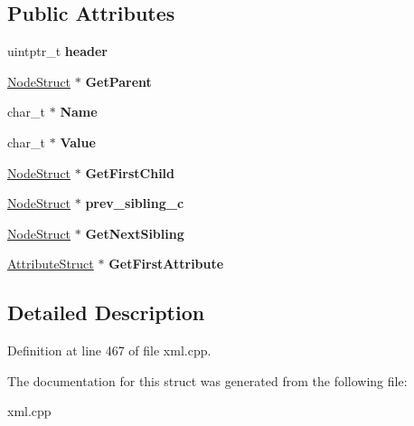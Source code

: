 \subsection*{Public Attributes}
\begin{DoxyCompactItemize}
\item 
\hypertarget{structphys_1_1xml_1_1NodeStruct_a68ff269f03bdab91cbeb96174d4df3a8}{
uintptr\_\-t {\bfseries header}}
\label{d7/dd5/structphys_1_1xml_1_1NodeStruct_a68ff269f03bdab91cbeb96174d4df3a8}

\item 
\hypertarget{structphys_1_1xml_1_1NodeStruct_a18b9637a936d402699a28f37866140b8}{
\hyperlink{structphys_1_1xml_1_1NodeStruct}{NodeStruct} $\ast$ {\bfseries GetParent}}
\label{d7/dd5/structphys_1_1xml_1_1NodeStruct_a18b9637a936d402699a28f37866140b8}

\item 
\hypertarget{structphys_1_1xml_1_1NodeStruct_ab27d7b1bf921844a9af1f4083f59f198}{
char\_\-t $\ast$ {\bfseries Name}}
\label{d7/dd5/structphys_1_1xml_1_1NodeStruct_ab27d7b1bf921844a9af1f4083f59f198}

\item 
\hypertarget{structphys_1_1xml_1_1NodeStruct_a183475da096134672af3de253b2cc4c3}{
char\_\-t $\ast$ {\bfseries Value}}
\label{d7/dd5/structphys_1_1xml_1_1NodeStruct_a183475da096134672af3de253b2cc4c3}

\item 
\hypertarget{structphys_1_1xml_1_1NodeStruct_a7c4d79e29adf579924ab9ec61107166e}{
\hyperlink{structphys_1_1xml_1_1NodeStruct}{NodeStruct} $\ast$ {\bfseries GetFirstChild}}
\label{d7/dd5/structphys_1_1xml_1_1NodeStruct_a7c4d79e29adf579924ab9ec61107166e}

\item 
\hypertarget{structphys_1_1xml_1_1NodeStruct_ab803e620f77fc53cdbb313702e9de966}{
\hyperlink{structphys_1_1xml_1_1NodeStruct}{NodeStruct} $\ast$ {\bfseries prev\_\-sibling\_\-c}}
\label{d7/dd5/structphys_1_1xml_1_1NodeStruct_ab803e620f77fc53cdbb313702e9de966}

\item 
\hypertarget{structphys_1_1xml_1_1NodeStruct_abc3a431a752cfb55f5f5fbae57e14f54}{
\hyperlink{structphys_1_1xml_1_1NodeStruct}{NodeStruct} $\ast$ {\bfseries GetNextSibling}}
\label{d7/dd5/structphys_1_1xml_1_1NodeStruct_abc3a431a752cfb55f5f5fbae57e14f54}

\item 
\hypertarget{structphys_1_1xml_1_1NodeStruct_a4e0cb6f144b810d52dc3506cc1e65785}{
\hyperlink{structphys_1_1xml_1_1AttributeStruct}{AttributeStruct} $\ast$ {\bfseries GetFirstAttribute}}
\label{d7/dd5/structphys_1_1xml_1_1NodeStruct_a4e0cb6f144b810d52dc3506cc1e65785}

\end{DoxyCompactItemize}


\subsection{Detailed Description}


Definition at line 467 of file xml.cpp.



The documentation for this struct was generated from the following file:\begin{DoxyCompactItemize}
\item 
xml.cpp\end{DoxyCompactItemize}
